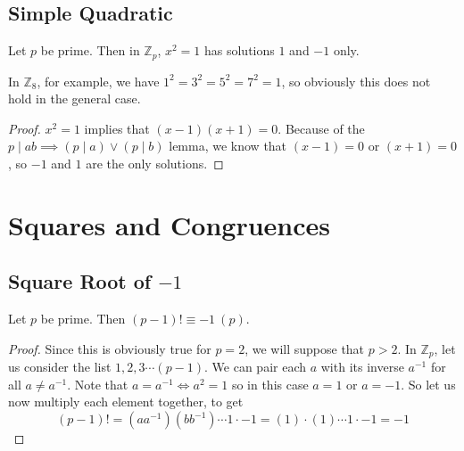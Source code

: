 \documentclass{article}
\begin{document}
\subsection{Simple Quadratic}
\begin{lemma}
	Let $p$ be prime. Then in $\mathbb Z_p$, $x^2 = 1$ has solutions $1$ and $-1$ only.
\end{lemma}
\begin{note}
	In $\mathbb Z_8$, for example, we have $1^2 = 3^2 = 5^2 = 7^2 = 1$, so obviously this does not hold in the general case.
\end{note}
\begin{proof}
	$x^2 = 1$ implies that $(x-1)(x+1) = 0$. Because of the $p\mid ab\implies (p\mid a) \lor (p\mid b)$ lemma, we know that $(x-1) = 0$ or $(x+1) = 0$, so $-1$ and $1$ are the only solutions.
\end{proof}

\section{Squares and Congruences}
\subsection{Square Root of $-1$}
\begin{theorem}
	Let $p$ be prime. Then $(p-1)! \equiv -1\ (p)$.
\end{theorem}
\begin{proof}
	Since this is obviously true for $p=2$, we will suppose that $p>2$. In $\mathbb Z_p$, let us consider the list $1, 2, 3 \cdots (p-1)$. We can pair each $a$ with its inverse $a^{-1}$ for all $a \neq a^{-1}$. Note that $a = a^{-1} \iff a^2 = 1$ so in this case $a=1$ or $a=-1$. So let us now multiply each element together, to get
	\[ (p-1)! = (aa^{-1}) (bb^{-1}) \cdots 1 \cdot -1 = (1) \cdot (1) \cdots 1 \cdot -1 = -1 \]
\end{proof}
\end{document}
